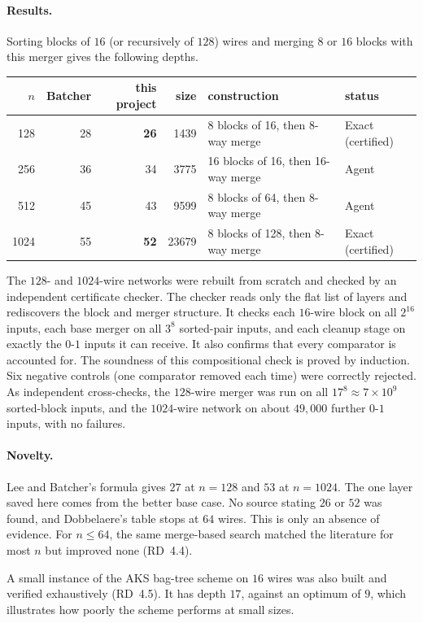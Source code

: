 \paragraph{Results.} Sorting blocks of $16$ (or recursively of $128$) wires and merging $8$ or $16$ blocks with this merger gives the following depths.
\begin{center}
\begin{tabular}{rrrrll}
\toprule
$n$ & Batcher & this project & size & construction & status \\
\midrule
128 & 28 & \textbf{26} & 1439 & 8 blocks of 16, then 8-way merge & Exact (certified) \\
256 & 36 & 34 & 3775 & 16 blocks of 16, then 16-way merge & Agent \\
512 & 45 & 43 & 9599 & 8 blocks of 64, then 8-way merge & Agent \\
1024 & 55 & \textbf{52} & 23679 & 8 blocks of 128, then 8-way merge & Exact (certified) \\
\bottomrule
\end{tabular}
\end{center}
The $128$- and $1024$-wire networks were rebuilt from scratch and checked by an independent certificate checker. The checker reads only the flat list of layers and rediscovers the block and merger structure. It checks each $16$-wire block on all $2^{16}$ inputs, each base merger on all $3^8$ sorted-pair inputs, and each cleanup stage on exactly the $0$-$1$ inputs it can receive. It also confirms that every comparator is accounted for. The soundness of this compositional check is proved by induction. Six negative controls (one comparator removed each time) were correctly rejected. As independent cross-checks, the $128$-wire merger was run on all $17^8 \approx 7\times 10^9$ sorted-block inputs, and the $1024$-wire network on about $49{,}000$ further $0$-$1$ inputs, with no failures.

\paragraph{Novelty.} Lee and Batcher's formula \cite{lee1995multiway} gives $27$ at $n = 128$ and $53$ at $n = 1024$. The one layer saved here comes from the better base case. No source stating $26$ or $52$ was found, and Dobbelaere's table stops at $64$ wires. This is only an absence of evidence. For $n \le 64$, the same merge-based search matched the literature for most $n$ but improved none (RD~4.4).

A small instance of the AKS bag-tree scheme on $16$ wires was also built and verified exhaustively (RD~4.5). It has depth $17$, against an optimum of $9$, which illustrates how poorly the scheme performs at small sizes.

